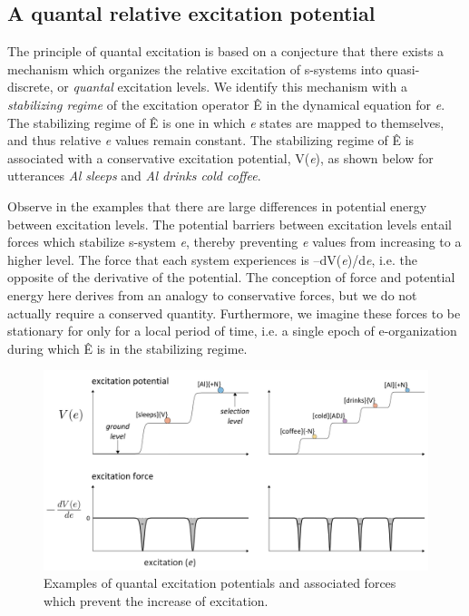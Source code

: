 \subsection{A quantal relative excitation potential}

The principle of quantal excitation is based on a conjecture that there exists a mechanism which organizes the relative excitation of s-systems into quasi-discrete, or \textit{quantal} excitation levels. We identify this mechanism with a \textit{stabilizing regime} of the excitation operator Ê in the dynamical equation for \textit{e}. The stabilizing regime of Ê is one in which \textit{e} states are mapped to themselves, and thus relative \textit{e} values remain constant. The stabilizing regime of Ê is associated with a conservative excitation potential, V(\textit{e}), as shown below for utterances \textit{Al sleeps} and \textit{Al drinks cold coffee}. 

  Observe in the examples that there are large differences in potential energy between excitation levels. The potential barriers between excitation levels entail forces which stabilize s-system \textit{e}, thereby preventing \textit{e} values from increasing to a higher level. The force that each system experiences is –dV(\textit{e})/d\textit{e}, i.e. the opposite of the derivative of the potential. The conception of force and potential energy here derives from an analogy to conservative forces, but we do not actually require a conserved quantity. Furthermore, we imagine these forces to be stationary for only for a local period of time, i.e. a single epoch of e-organization during which Ê is in the stabilizing regime. 

  
\begin{figure}
\includegraphics[width=\textwidth]{figures/Tilsen-img23.png}
\caption{Examples of quantal excitation potentials and associated forces which prevent the increase of excitation.}
\label{fig:2:16}
\end{figure}
 

